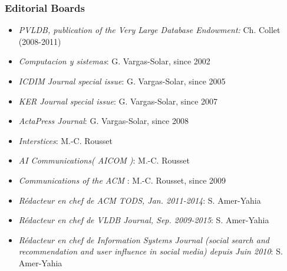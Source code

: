 \subsubsection*{Editorial Boards}

\begin{itemize}
\setlength{\itemindent}{-0.5cm}
\setlength{\itemsep}{-0.1cm}
\item {\it PVLDB, publication of the Very Large Database Endowment:} Ch. Collet (2008-2011)

\item {\it Computacion y sistemas}: G. Vargas-Solar, since 2002

\item {\it ICDIM Journal special issue}: G. Vargas-Solar, since 2005

\item {\it KER Journal special issue}: G. Vargas-Solar, since 2007

\item {\it ActaPress Journal}: G. Vargas-Solar, since 2008

\item {\it Interstices}: M.-C. Rousset

\item {\it AI Communications( AICOM )}: M.-C. Rousset

\item {\it Communications of the ACM }: M.-C. Rousset,  since 2009

\item \emph{R\'edacteur en chef de ACM TODS, Jan. 2011-2014}:  S. Amer-Yahia

\item \emph{R\'edacteur en chef de VLDB Journal, Sep. 2009-2015}:  S. Amer-Yahia

\item \emph{R\'edacteur en chef de Information Systems Journal (social search and recommendation and user influence in social media) depuis Juin 2010}:  S. Amer-Yahia
    


\end{itemize}


